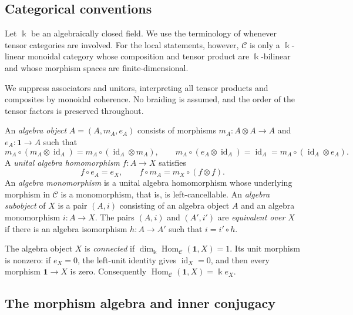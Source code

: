 \documentclass[11pt]{amsart}
\theoremstyle{definition}
\theoremstyle{remark}
\newcommand{\C}{\mathcal C}
\newcommand{\one}{\mathbf 1}
\newcommand{\kk}{\Bbbk}
\DeclareMathOperator{\Hom}{Hom}
\DeclareMathOperator{\id}{id}
\begin{document}
\subsection{Categorical conventions}

Let $\kk$ be an algebraically closed field.  We use the terminology of
\cite{EGNO} whenever tensor categories are involved.  For the local
statements, however, $\C$ is only a $\kk$-linear monoidal category whose
composition and tensor product are $\kk$-bilinear and whose morphism spaces
are finite-dimensional.

We suppress associators and unitors, interpreting all tensor products and
composites by monoidal coherence.  No braiding is assumed, and the order of
the tensor factors is preserved throughout.

An \emph{algebra object} $A=(A,m_A,e_A)$ consists of morphisms
$m_A:A\otimes A\to A$ and $e_A:\one\to A$ such that
\[
 m_A\circ(m_A\otimes\id_A)=m_A\circ(\id_A\otimes m_A),
 \qquad
 m_A\circ(e_A\otimes\id_A)=\id_A
 =m_A\circ(\id_A\otimes e_A).
\]
A \emph{unital algebra homomorphism} $f:A\to X$ satisfies
\[
 f\circ e_A=e_X,
 \qquad
 f\circ m_A=m_X\circ(f\otimes f).
\]
An \emph{algebra monomorphism} is a unital algebra homomorphism whose
underlying morphism in $\C$ is a monomorphism, that is, is left-cancellable.
An \emph{algebra subobject} of $X$ is a pair $(A,i)$ consisting of an algebra
object $A$ and an algebra monomorphism $i:A\to X$.  The pairs $(A,i)$ and
$(A',i')$ are \emph{equivalent over $X$} if there is an algebra isomorphism
$h:A\to A'$ such that $i=i'\circ h$.

The algebra object $X$ is \emph{connected} if
$\dim_{\kk}\Hom_{\C}(\one,X)=1$.  Its unit morphism is nonzero: if $e_X=0$,
the left-unit identity gives $\id_X=0$, and then every morphism $\one\to X$
is zero.  Consequently $\Hom_{\C}(\one,X)=\kk e_X$.

\subsection{The morphism algebra and inner conjugacy}
\end{document}
